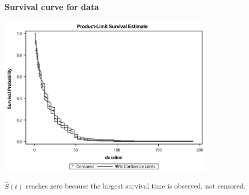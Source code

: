 \documentclass{beamer}
\begin{document}
\begin{frame}
\frametitle{Survival curve for  data }

\begin{center}
\includegraphics[width = 0.8\textwidth]{img/c7/slides7e08}
\end{center}
{\footnotesize $\widehat{S}(t)$ reaches zero because the largest survival time is observed, not censored.

}
\end{frame}
% 
% 
%     
% 
% 
% 
% 
\end{document}

